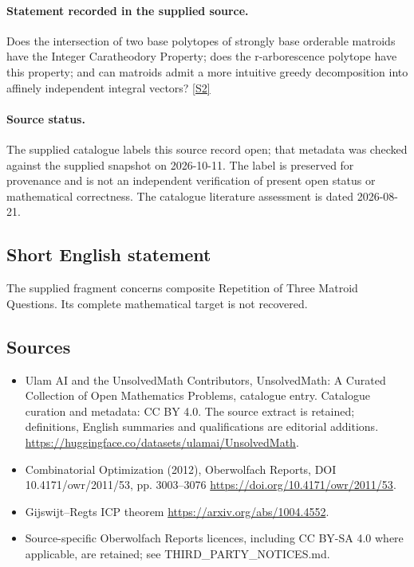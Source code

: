 \documentclass[11pt]{article}
\newcommand{\sref}[2]{\hyperlink{source:#1:#2}{[S#2]}}
\begin{document}
\paragraph{Statement recorded in the supplied source.}
Does the intersection of two base polytopes of strongly base orderable matroids have the Integer Caratheodory Property; does the r-arborescence polytope have this property; and can matroids admit a more intuitive greedy decomposition into affinely independent integral vectors? \sref{statement}{2}
\paragraph{Source status.}
The supplied catalogue labels this source record open; that metadata was checked against the supplied snapshot on 2026-10-11. The label is preserved for provenance and is not an independent verification of present open status or mathematical correctness. The catalogue literature assessment is dated 2026-08-21.
\subsection{Short English statement}
The supplied fragment concerns composite Repetition of Three Matroid Questions. Its complete mathematical target is not recovered.
\subsection{Sources}
\begin{itemize}
\item[\hypertarget{source:statement:1}{S1}] Ulam AI and the UnsolvedMath Contributors, UnsolvedMath: A Curated Collection of Open Mathematics Problems, catalogue entry. Catalogue curation and metadata: CC BY 4.0. The source extract is retained; definitions, English summaries and qualifications are editorial additions.
\url{https://huggingface.co/datasets/ulamai/UnsolvedMath}.
\item[\hypertarget{source:statement:2}{S2}] Combinatorial Optimization (2012), Oberwolfach Reports, DOI 10.4171/owr/2011/53, pp. 3003--3076
\url{https://doi.org/10.4171/owr/2011/53}.
\item[\hypertarget{source:statement:3}{S3}] Gijswijt--Regts ICP theorem
\url{https://arxiv.org/abs/1004.4552}.
\item Source-specific Oberwolfach Reports licences, including CC BY-SA 4.0 where applicable, are retained; see THIRD\_PARTY\_NOTICES.md.
\end{itemize}
\end{document}

